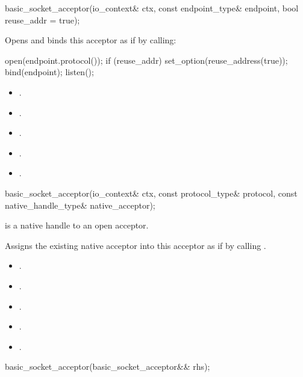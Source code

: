\begin{itemdecl}
basic_socket_acceptor(io_context& ctx, const endpoint_type& endpoint,
                      bool reuse_addr = true);
\end{itemdecl}

\begin{itemdescr}
\pnum
\effects Opens and binds this acceptor as if by calling:
\begin{codeblock}
open(endpoint.protocol());
if (reuse_addr)
  set_option(reuse_address(true));
bind(endpoint);
listen();
\end{codeblock}


\pnum
\postconditions
\begin{itemize}
\item
{}.
\item
{}.
\item
{}.
\item
{}.
\item
{}.
\end{itemize}
\end{itemdescr}

\begin{itemdecl}
basic_socket_acceptor(io_context& ctx, const protocol_type& protocol,
                      const native_handle_type& native_acceptor);
\end{itemdecl}

\begin{itemdescr}
\pnum
\expects {} is a native handle to an open acceptor.

\pnum
\effects Assigns the existing native acceptor into this acceptor as if by calling .

\pnum
\postconditions
\begin{itemize}
\item
{}.
\item
{}.
\item
{}.
\item
{}.
\item
{}.
\end{itemize}
\end{itemdescr}

\begin{itemdecl}
basic_socket_acceptor(basic_socket_acceptor&& rhs);
\end{itemdecl}

